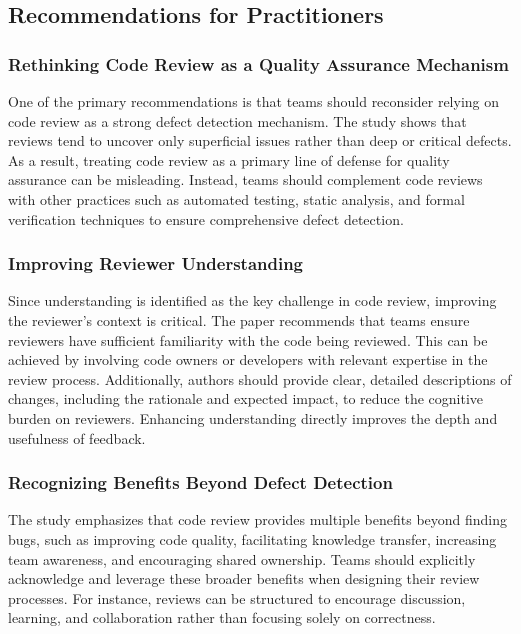 \subsection{Recommendations for Practitioners}

\subsubsection{Rethinking Code Review as a Quality Assurance Mechanism}
One of the primary recommendations is that teams should reconsider relying on code review as a strong defect detection mechanism. The study shows that reviews tend to uncover only superficial issues rather than deep or critical defects. As a result, treating code review as a primary line of defense for quality assurance can be misleading. Instead, teams should complement code reviews with other practices such as automated testing, static analysis, and formal verification techniques to ensure comprehensive defect detection.

\subsubsection{Improving Reviewer Understanding}
Since understanding is identified as the key challenge in code review, improving the reviewer’s context is critical. The paper recommends that teams ensure reviewers have sufficient familiarity with the code being reviewed. This can be achieved by involving code owners or developers with relevant expertise in the review process. Additionally, authors should provide clear, detailed descriptions of changes, including the rationale and expected impact, to reduce the cognitive burden on reviewers. Enhancing understanding directly improves the depth and usefulness of feedback.

\subsubsection{Recognizing Benefits Beyond Defect Detection}
The study emphasizes that code review provides multiple benefits beyond finding bugs, such as improving code quality, facilitating knowledge transfer, increasing team awareness, and encouraging shared ownership. Teams should explicitly acknowledge and leverage these broader benefits when designing their review processes. For instance, reviews can be structured to encourage discussion, learning, and collaboration rather than focusing solely on correctness.

